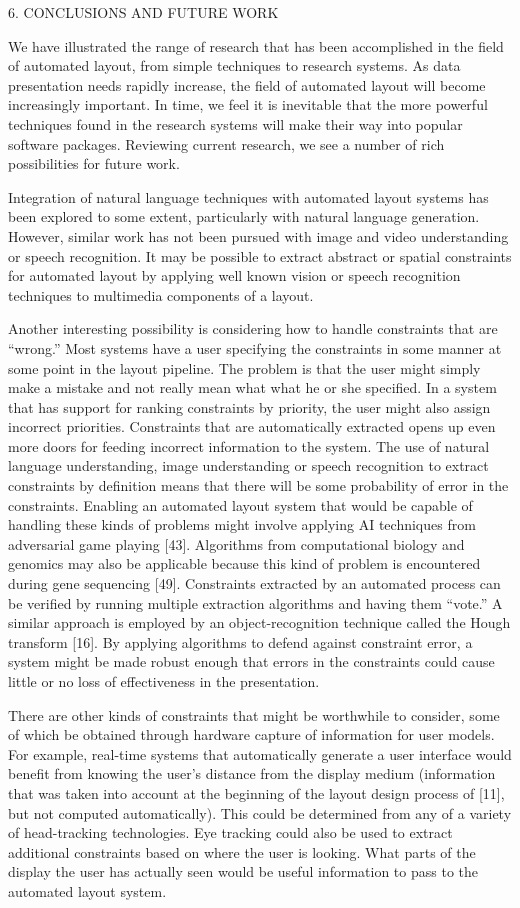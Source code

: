     6. CONCLUSIONS AND FUTURE WORK

    We have illustrated the range of research that has been accomplished in the field of automated layout, from simple techniques to research systems. As data presentation needs rapidly increase, the field of automated layout will become increasingly important. In time, we feel it is inevitable that the more powerful techniques found in the research systems will make their way into popular software packages. Reviewing current research, we see a number of rich possibilities for future work.

    Integration of natural language techniques with automated layout systems has been explored to some extent, particularly with natural language generation. However, similar work has not been pursued with image and video understanding or speech recognition. It may be possible to extract abstract or spatial constraints for automated layout by applying well known vision or speech recognition techniques to multimedia components of a layout.

    Another interesting possibility is considering how to handle constraints that are “wrong.” Most systems have a user specifying the constraints in some manner at some point in the layout pipeline. The problem is that the user might simply make a mistake and not really mean what what he or she specified. In a system that has support for ranking constraints by priority, the user might also assign incorrect priorities. Constraints that are automatically extracted opens up even more doors for feeding incorrect information to the system. The use of natural language understanding, image understanding or speech recognition to extract constraints by definition means that there will be some probability of error in the constraints. Enabling an automated layout system that would be capable of handling these kinds of problems might involve applying AI techniques from adversarial game playing [43]. Algorithms from computational biology and genomics may also be applicable because this kind of problem is encountered during gene sequencing [49]. Constraints extracted by an automated process can be verified by running multiple extraction algorithms and having them “vote.” A similar approach is employed by an object-recognition technique called the Hough transform [16]. By applying algorithms to defend against constraint error, a system might be made robust enough that errors in the constraints could cause little or no loss of effectiveness in the presentation.

    There are other kinds of constraints that might be worthwhile to consider, some of which be obtained through hardware capture of information for user models. For example, real-time systems that automatically generate a user interface would benefit from knowing the user’s distance from the display medium (information that was taken into account at the beginning of the layout design process of [11], but not computed automatically). This could be determined from any of a variety of head-tracking technologies. Eye tracking could also be used to extract additional constraints based on where the user is looking. What parts of the display the user has actually seen would be useful information to pass to the automated layout system.

